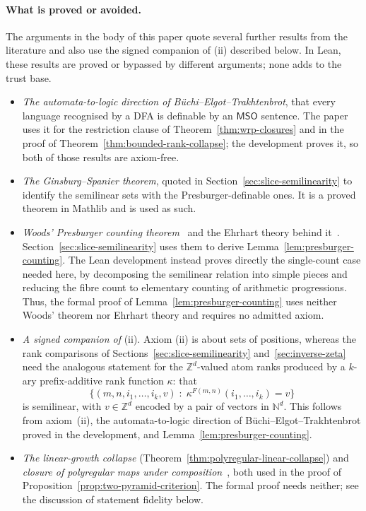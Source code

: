 \documentclass[11pt]{article}
\theoremstyle{definition}
\newcommand{\N}{\mathbb N}
\newcommand{\Z}{\mathbb Z}
\newcommand{\MSO}{\mathsf{MSO}}
\begin{document}
\paragraph{What is proved or avoided.}
The arguments in the body of this paper quote several further results from the
literature and also use the signed companion of (ii) described below.  In Lean,
these results are proved or bypassed by different arguments; none adds to the
trust base.
\begin{itemize}
\item \emph{The automata-to-logic direction of B\"uchi--Elgot--Trakhtenbrot},
that every language recognised by a DFA is definable by an $\MSO$ sentence.
The paper uses it for the restriction clause
of Theorem~\ref{thm:wrp-closures} and in the proof of
Theorem~\ref{thm:bounded-rank-collapse}; the development proves it, so both of
those results are axiom-free.

\item \emph{The Ginsburg--Spanier theorem}, quoted in
Section~\ref{sec:slice-semilinearity} to identify the semilinear sets with the
Presburger-definable ones.  It is a proved theorem in Mathlib and is used as
such.

\item \emph{Woods' Presburger counting theorem}~\cite[Theorem~1.10]{Woods2015}
and the Ehrhart theory behind it~\cite{Ehrhart1962}.
Section~\ref{sec:slice-semilinearity} uses them to derive
Lemma~\ref{lem:presburger-counting}.  The Lean development instead proves
directly the single-count case needed here, by decomposing the semilinear
relation into simple pieces and reducing the fibre count to elementary
counting of arithmetic progressions.  Thus, the formal proof of
Lemma~\ref{lem:presburger-counting} uses neither Woods' theorem nor Ehrhart
theory and requires no admitted axiom.

\item \emph{A signed companion of} (ii).  Axiom (ii) is about sets of
positions, whereas the rank comparisons of
Sections~\ref{sec:slice-semilinearity} and~\ref{sec:inverse-zeta} need the
analogous statement for the $\Z^d$-valued atom ranks produced by a $k$-ary
prefix-additive rank function $\kappa$: that
\[
   \bigl\{(m,n,i_1,\ldots,i_k,v)\;:\;
          \kappa^{F(m,n)}(i_1,\ldots,i_k)=v\bigr\}
\]
is semilinear, with $v\in\Z^d$ encoded by a pair of vectors in $\N^d$.  This
follows from axiom~(ii), the automata-to-logic direction of
B\"uchi--Elgot--Trakhtenbrot proved in the development, and
Lemma~\ref{lem:presburger-counting}.

\item \emph{The linear-growth collapse}
(Theorem~\ref{thm:polyregular-linear-collapse}) and \emph{closure of polyregular
maps under composition}~\cite{Bojanczyk2018}, both used in the proof of
Proposition~\ref{prop:two-pyramid-criterion}.  The formal proof needs neither;
see the discussion of statement fidelity below.
\end{itemize}
\end{document}
